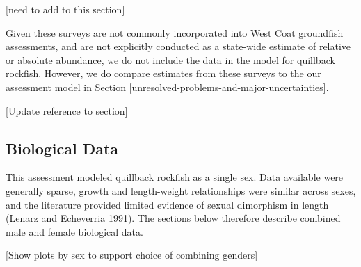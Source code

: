 \documentclass[11pt,
  english,
  a4paper,
]{article}
\begin{document}

{[}need to add to this section{]}

\leavevmode\tagmcend\tagstructend\par


Given these surveys are not commonly incorporated into West Coat groundfish assessments, and are not explicitly conducted as a state-wide estimate of relative or absolute abundance, we do not include the data in the model for quillback rockfish. However, we do compare estimates from these surveys to the our assessment model in Section \ref{unresolved-problems-and-major-uncertainties}.

\leavevmode\tagmcend\tagstructend\par


{[}Update reference to section{]}

\leavevmode\tagmcend\tagstructend\par


\hypertarget{biological-data}{%
\subsection{Biological Data}\label{biological-data}}

\leavevmode\tagmcend\tagstructend


This assessment modeled quillback rockfish as a single sex. Data available were generally sparse, growth and length-weight relationships were similar across sexes, and the literature provided limited evidence of sexual dimorphism in length {(Lenarz and Echeverria 1991)\leavevmode\tagmcend\tagstructend}. The sections below therefore describe combined male and female biological data.

\leavevmode\tagmcend\tagstructend\par


{[}Show plots by sex to support choice of combining genders{]}

\leavevmode\tagmcend\tagstructend\par
\end{document}
